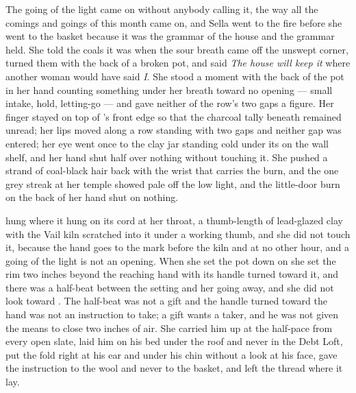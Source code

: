 \scenebreak

The going of the light came on without anybody calling it, the way all the comings and goings of this month came on, and Sella went to the fire before she went to the basket because it was the grammar of the house and the grammar held. She told the coals it was  when the sour breath came off the unswept corner, turned them with the back of a broken pot, and said \emph{The house will keep it} where another woman would have said \emph{I}. She stood a moment with the back of the pot in her hand counting something under her breath toward no opening --- small intake, hold, letting-go --- and gave neither of the row's two gaps a figure. Her finger stayed on top of 's front edge so that the charcoal tally beneath remained unread; her lips moved along a row standing with two gaps and neither gap was entered; her eye went once to the clay jar standing cold under its  on the wall shelf, and her hand shut half over nothing without touching it. She pushed a strand of coal-black hair back with the wrist that carries the burn, and the one grey streak at her temple showed pale off the low light, and the little-door burn on the back of her hand shut on nothing.

 hung where it hung on its cord at her throat, a thumb-length of lead-glazed clay with the Vail kiln scratched into it under a working thumb, and she did not touch it, because the hand goes to the mark before the kiln and at no other hour, and a going of the light is not an opening. When she set the pot down on  she set the rim two inches beyond the reaching hand with its handle turned toward it, and there was a half-beat between the setting and her going away, and she did not look toward . The half-beat was not a gift and the handle turned toward the hand was not an instruction to take; a gift wants a taker, and he was not given the means to close two inches of air. She carried him up at the half-pace from every open slate, laid him on his bed under the roof and never in the Debt Loft, put the fold right at his ear and under his chin without a look at his face, gave the instruction to the wool and never to the basket, and left the thread where it lay.

